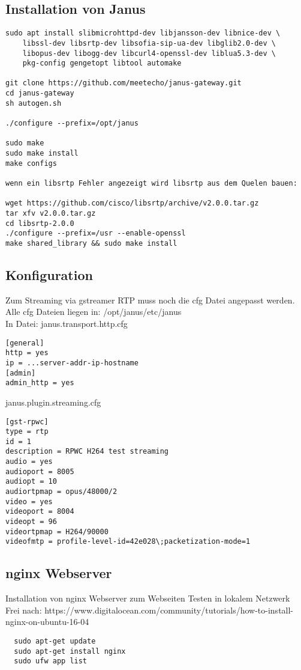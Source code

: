 \subsection{Installation von Janus}
\begin{verbatim}
sudo apt install slibmicrohttpd-dev libjansson-dev libnice-dev \
	libssl-dev libsrtp-dev libsofia-sip-ua-dev libglib2.0-dev \
	libopus-dev libogg-dev libcurl4-openssl-dev liblua5.3-dev \
	pkg-config gengetopt libtool automake

git clone https://github.com/meetecho/janus-gateway.git
cd janus-gateway
sh autogen.sh

./configure --prefix=/opt/janus

sudo make 
sudo make install 
make configs

wenn ein libsrtp Fehler angezeigt wird libsrtp aus dem Quelen bauen:

wget https://github.com/cisco/libsrtp/archive/v2.0.0.tar.gz
tar xfv v2.0.0.tar.gz
cd libsrtp-2.0.0
./configure --prefix=/usr --enable-openssl
make shared_library && sudo make install
\end{verbatim}

\subsection{Konfiguration}
Zum Streaming via gstreamer RTP muss noch die cfg Datei angepasst werden.\\
Alle cfg Dateien liegen in: /opt/janus/etc/janus\\

In Datei: janus.transport.http.cfg
\begin{verbatim}
[general]
http = yes
ip = ...server-addr-ip-hostname
[admin]
admin_http = yes
\end{verbatim}

janus.plugin.streaming.cfg
\begin{verbatim}
[gst-rpwc]
type = rtp 
id = 1 
description = RPWC H264 test streaming 
audio = yes 
audioport = 8005 
audiopt = 10 
audiortpmap = opus/48000/2 
video = yes 
videoport = 8004 
videopt = 96 
videortpmap = H264/90000 
videofmtp = profile-level-id=42e028\;packetization-mode=1 
\end{verbatim}

\subsection{nginx Webserver} \label{Refnginx}
Installation von nginx Webserver zum Webseiten Testen in lokalem Netzwerk\\
Frei nach: https://www.digitalocean.com/community/tutorials/how-to-install-nginx-on-ubuntu-16-04
\begin{verbatim}
  sudo apt-get update
  sudo apt-get install nginx
  sudo ufw app list
\end{verbatim}

